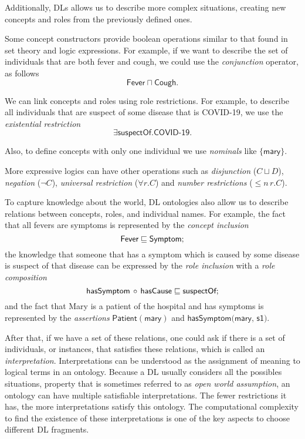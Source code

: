 Additionally, DLs allows us to describe more complex situations, creating new concepts and roles from the previously defined ones.

Some concept constructors provide boolean operations similar to that found in set theory and logic expressions. For example, if we want to describe the set of individuals that are both fever and cough, we could use the \emph{conjunction} operator, as follows
\[
	\textsf{Fever} \sqcap \textsf{Cough}.
\]

We can link concepts and roles using role restrictions. For example, to describe all individuals that are suspect of some disease that is COVID-19, we use the \emph{existential restriction}
\[
	\exists \textsf{suspectOf}.\textsf{COVID-19}.
\]

Also, to define concepts with only one individual we use \emph{nominals} like $\{\textsf{mary}\}$.

More expressive logics can have other operations such as \emph{disjunction} ($C \sqcup D$), \emph{negation} ($\lnot C$), \emph{universal restriction} ($\forall r.C$) and \emph{number restrictions} ($\leq\!\! n\, r.C$).

To capture knowledge about the world, DL ontologies also allow us to describe relations between concepts, roles, and individual names. For example, the fact that all fevers are symptoms is represented by the \emph{concept inclusion}
\[
	\textsf{Fever} \sqsubseteq \textsf{Symptom};
\]
the knowledge that someone that has a symptom which is caused by some disease is suspect of that disease can be expressed by the \emph{role inclusion} with a \emph{role composition}
\[
	\textsf{hasSymptom} \, \circ \, \textsf{hasCause} \sqsubseteq \textsf{suspectOf};
\]
and the fact that Mary is a patient of the hospital and has symptoms is represented by the \emph{assertions} $\textsf{Patient}(\textsf{mary})$ and $\textsf{hasSymptom(mary, s1)}$.

After that, if we have a set of these relations, one could ask if there is a set of individuals, or instances, that satisfies these relations, which is called an \emph{interpretation}. Interpretations can be understood as the assignment of meaning to logical terms in an ontology. Because a DL usually considers all the possibles situations, property that is sometimes referred to as \emph{open world assumption}, an ontology can have multiple satisfiable interpretations. The fewer restrictions it has, the more interpretations satisfy this ontology. The computational complexity to find the existence of these interpretations is one of the key aspects to choose different DL fragments.

